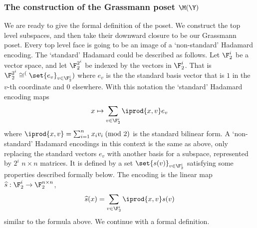 \subsubsection[The construction of the Grassmann posets]{The construction of the Grassmann poset \(\M(\Y)\)}
We are ready to give the formal definition of the poset. We construct the top level subspaces, and then take their downward closure to be our Grassmann poset. Every top level face is going to be an image of a `non-standard' Hadamard encoding. The `standard' Hadamard could be described as follows. Let \(\F_2^i\) be a vector space, and let \(\F_2^{2^i}\) be indexed by the vectors in \(\F_2^i\). That is \(\F_2^{2^i} \cong \sp(\set{e_v}_{v \in \F_2^i})\) where \(e_v\) is the the standard basis vector that is \(1\) in the \(v\)-th coordinate and \(0\) elsewhere. With this notation the `standard' Hadamard encoding maps 
\[x \mapsto \sum_{v \in \F_2^i}\iprod{x,v} e_v\]
where \(\iprod{x,v} = \sum_{i=1}^n x_i v_i \; \text{(mod 2)}\) is the standard bilinear form. A `non-standard' Hadamard encodings in this context is the same as above, only replacing the standard vectors \(e_v\) with another basis for a subspace, represented by \(2^{i}\) \(n \times n\) matrices. It is defined by a set \(\set{s(v)}_{v \in \F_2^i}\) satisfying some properties described formally below. The encoding is the linear map \(\widehat{s}:\F_2^i \to \F_2^{n \times n}\),
\[\widehat{s}(x) = \sum_{v \in \F_2^i}\iprod{x,v}s(v)\]
similar to the formula above.
%
We continue with a formal definition.

